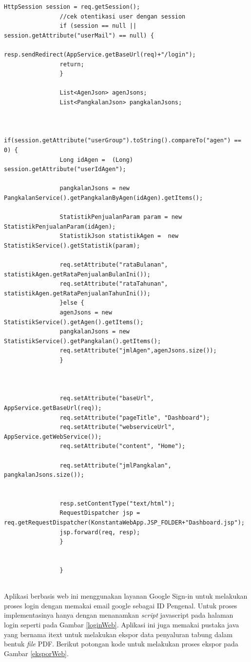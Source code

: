 \begin{enumerate}[a.]
\begin{lstlisting}[caption=Potongan kode \textit{controller} aplikasi berbasis web, label=controllerWeb]
				HttpSession session = req.getSession();
				//cek otentikasi user dengan session
				if (session == null || session.getAttribute("userMail") == null) {
				resp.sendRedirect(AppService.getBaseUrl(req)+"/login");
				return;
				}
				
				List<AgenJson> agenJsons;
				List<PangkalanJson> pangkalanJsons;
				
				
				if(session.getAttribute("userGroup").toString().compareTo("agen") == 0) {
				Long idAgen =  (Long) session.getAttribute("userIdAgen");
				
				pangkalanJsons = new PangkalanService().getPangkalanByAgen(idAgen).getItems();
				
				StatistikPenjualanParam param = new StatistikPenjualanParam(idAgen);
				StatistikJson statistikAgen =  new StatistikService().getStatistik(param);
				
				req.setAttribute("rataBulanan", statistikAgen.getRataPenjualanBulanIni());
				req.setAttribute("rataTahunan", statistikAgen.getRataPenjualanTahunIni());
				}else {
				agenJsons = new StatistikService().getAgen().getItems();
				pangkalanJsons = new StatistikService().getPangkalan().getItems();
				req.setAttribute("jmlAgen",agenJsons.size());
				}
				
				
				
				req.setAttribute("baseUrl", AppService.getBaseUrl(req));
				req.setAttribute("pageTitle", "Dashboard");
				req.setAttribute("webserviceUrl", AppService.getWebService());
				req.setAttribute("content", "Home");
				
				req.setAttribute("jmlPangkalan", pangkalanJsons.size());
				
				
				resp.setContentType("text/html");
				RequestDispatcher jsp = req.getRequestDispatcher(KonstantaWebApp.JSP_FOLDER+"Dashboard.jsp");
				jsp.forward(req, resp);
				}
				
				
				}
		
		\end{lstlisting}
	
		Aplikasi berbasis web ini menggunakan layanan Google Sign-in untuk melakukan proses login dengan memakai email google sebagai ID Pengenal. Untuk proses implementasinya hanya dengan menanamkan \textit{script} javascript pada halaman login seperti pada Gambar \ref{loginWeb}. Aplikasi ini juga memakai pustaka java yang bernama itext untuk melakukan ekspor data penyaluran tabung dalam bentuk \textit{file} PDF. Berikut potongan kode untuk melakukan proses ekspor pada Gambar \ref{eksporWeb}.
	

\end{enumerate}
